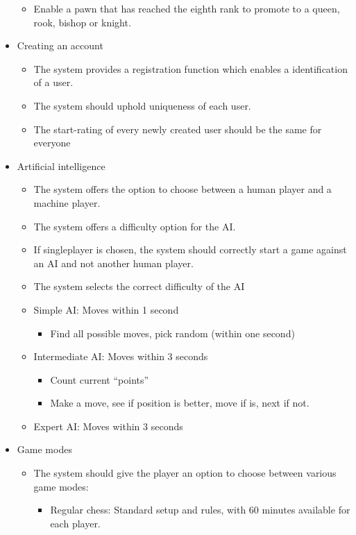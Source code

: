 \documentclass{article}
\begin{document}
\begin{itemize}
\begin{itemize}
		\item Enable a pawn that has reached the eighth rank to promote to a queen, rook, bishop or knight. 
	\end{itemize}
	\item Creating an account
	\begin{itemize}
		\item The system provides a registration function which enables a identification of a user.
		\item The system should uphold uniqueness of each user.
		\item The start-rating of every newly created user should be the same for everyone 
	\end{itemize}
	\item Artificial intelligence
	\begin{itemize}
	    \item The system offers the option to choose between a human player and a machine player.
		\item The system offers a difficulty option for the AI.
		\item If singleplayer is chosen, the system should correctly start a game against an AI and not another human player.
		\item The system selects the correct difficulty of the AI
		\item Simple AI: Moves within 1 second
		\begin{itemize}
			\item Find all possible moves, pick random (within one second)
		\end{itemize}
		\item Intermediate AI: Moves within 3 seconds
		\begin{itemize}
			\item Count current “points”
			\item Make a move, see if position is better, move if is, next if not.
		\end{itemize}
		\item Expert AI: Moves within 3 seconds
	\end{itemize}
	\item Game modes
	\begin{itemize}
		\item The system should give the player an option to choose between various game modes:
		\begin{itemize}
			\item Regular chess: Standard setup and rules, with 60 minutes available for each player.

\end{itemize}
\end{itemize}
\end{itemize}
\end{document}

